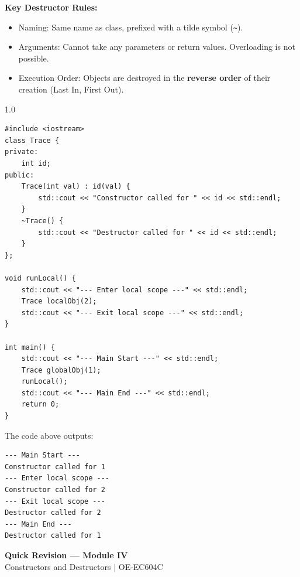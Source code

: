 \documentclass[12pt,a4paper]{article}
\begin{document}
\textbf{Key Destructor Rules:}
\begin{itemize}[leftmargin=*, itemsep=2pt]
  \item Naming: Same name as class, prefixed with a tilde symbol (\texttt{\textasciitilde}).
  \item Arguments: Cannot take any parameters or return values. Overloading is not possible.
  \item Execution Order: Objects are destroyed in the \textbf{reverse order} of their creation (Last In, First Out).
\end{itemize}

\begin{tcolorbox}[examplebox, title={Code Example: Tracing Constructor and Destructor Executions}]
\begin{spacing}{1.0}
\begin{verbatim}
#include <iostream>
class Trace {
private:
    int id;
public:
    Trace(int val) : id(val) {
        std::cout << "Constructor called for " << id << std::endl;
    }
    ~Trace() {
        std::cout << "Destructor called for " << id << std::endl;
    }
};

void runLocal() {
    std::cout << "--- Enter local scope ---" << std::endl;
    Trace localObj(2);
    std::cout << "--- Exit local scope ---" << std::endl;
}

int main() {
    std::cout << "--- Main Start ---" << std::endl;
    Trace globalObj(1);
    runLocal();
    std::cout << "--- Main End ---" << std::endl;
    return 0;
}
\end{verbatim}
\end{spacing}
\end{tcolorbox}
The code above outputs:
\begin{verbatim}
--- Main Start ---
Constructor called for 1
--- Enter local scope ---
Constructor called for 2
--- Exit local scope ---
Destructor called for 2
--- Main End ---
Destructor called for 1
\end{verbatim}

\newpage
\begin{center}
  {\large\bfseries\color{myred} Quick Revision --- Module IV}\\[3pt]
  {\small\color{mydark} Constructors and Destructors $|$ OE-EC604C}
\end{center}
\noindent{\color{myred}\rule{\linewidth}{1.2pt}}
\vspace{4pt}
\end{document}
